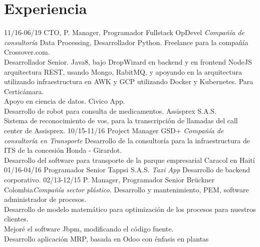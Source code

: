 \section{Experiencia}
\begin{entrylist}
  \entry
    {11/16-06/19}
    {CTO, P. Manager, Programador Fullstack}
    {OpDevel {\sl Compañía de consultoría}}
    {Data Processing, Desarrollador Python. Freelance para la compañía Crossover.com.\\
     Desarrollador Senior. Java8, bajo DropWizard en backend y en frontend NodeJS arquitectura REST,
     usando Mongo, RabitMQ, y apoyando en la arquitectura utilizando infraestructura en AWK y
     GCP utilizando Docker y Kubernetes. Para Certicámara.\\
     Apoyo en ciencia de datos. Civico App.\\
     Desarrollo de robot para consulta de medicamentos. Assisprex S.A.S.\\
     Sistema de reconocimiento de vos, para la transcripción de llamadas del call center de Assisprex.}
  \entry
    {10/15-11/16}
    {Project Manager}
    {GSD+ {\sl Compañía de consultoría en Transporte}}
    {Desarrollo de la consultoría para la infraestructura de ITS de la concesión Honda - Girardot.\\
     Desarrollo del software para transporte de la parque empresarial Caracol en Haití}
  \entry
    {01/16-04/16}
    {Programador Senior}
    {Tappsi S.A.S. {\sl Taxi App}}
    {Desarrollo de backend corporativo.}
  \entry
    {02/13-12/15}
    {P. Manager, Programador Senior}
    {Brückner Colombia{\sl Compañía sector plástico.}}%
    {Desarrollo y mantenimiento, PEM, software administrador de procesos.\\
     Desarrollo de modelo matemático para optimización de los procesos para nuestros clientes.\\
     Mejoré  el software Jbpm, modificando el código fuente.\\
     Desarrollo aplicación MRP, basada en Odoo con énfasis en plantas}
\end{entrylist}
\newpage

